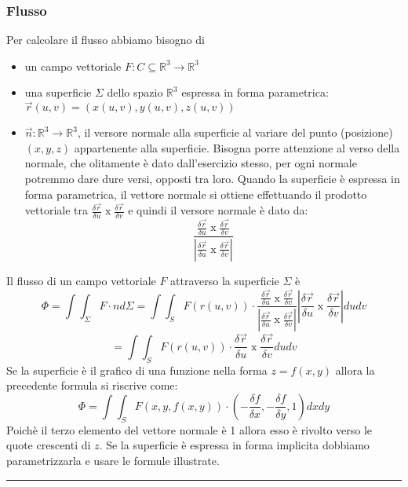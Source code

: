\subsubsection{Flusso}
Per calcolare il flusso abbiamo bisogno di
\begin{itemize}
    \item un campo vettoriale $F: C \subseteq \mathbb{R}^3 \rightarrow  \mathbb{R}^3$
    \item una superficie $\Sigma$ dello spazio $\mathbb{R}^3$ espressa in forma parametrica: $\vec{r}(u,v)  = (x(u,v), y(u,v), z(u,v))$
    \item $\vec{n}: \mathbb{R}^3 \rightarrow  \mathbb{R}^3$, il versore normale alla superficie al variare del punto (posizione) $(x,y,z)$ appartenente alla superficie. Bisogna porre attenzione al verso della normale, che olitamente è dato dall'esercizio stesso, per ogni normale potremmo dare dure versi, opposti tra loro. Quando la superficie è espressa in forma parametrica, il vettore normale si ottiene effettuando il prodotto vettoriale tra $\frac{\delta \vec{r}}{\delta u} \; \text{x}\;\frac{\delta \vec{r}}{\delta v}$ e quindi il versore normale è dato da:
    \[
        \frac{\frac{\delta \vec{r}}{\delta u} \; \text{x}\;\frac{\delta \vec{r}}{\delta v}}{\left|\frac{\delta \vec{r}}{\delta u} \; \text{x}\;\frac{\delta \vec{r}}{\delta v}\right|}
    \]
\end{itemize}
Il flusso di un campo vettoriale $F$ attraverso la superficie $\Sigma$ è
\[
    \Phi = \int \int_{\Sigma}F \cdot n d\Sigma = \int \int_S F(r(u,v)) \cdot \frac{\frac{\delta \vec{r}}{\delta u} \; \text{x}\;\frac{\delta \vec{r}}{\delta v}}{\left|\frac{\delta \vec{r}}{\delta u} \; \text{x}\;\frac{\delta \vec{r}}{\delta v}\right|} \left|\frac{\delta \vec{r}}{\delta u} \; \text{x}\;\frac{\delta \vec{r}}{\delta v}\right| du dv
\]
\[
    = \int \int_S F(r(u,v)) \cdot \frac{\delta \vec{r}}{\delta u} \; \text{x}\;\frac{\delta \vec{r}}{\delta v} du dv
\]
\newline
Se la superficie è il grafico di una funzione nella forma $z = f(x,y)$ allora la precedente formula si riscrive come:
\[
    \Phi = \int \int_S F(x,y,f(x,y)) \cdot \left( -\frac{\delta f}{\delta x}, -\frac{\delta f}{\delta y}, 1 \right) dx dy
\]
Poichè il terzo elemento del vettore normale è 1 allora esso è rivolto verso le quote crescenti di $z$.\newline
\newline
Se la superficie è espressa in forma implicita dobbiamo parametrizzarla e usare le formule illustrate.\newline
\rule{\textwidth}{0,4pt}
